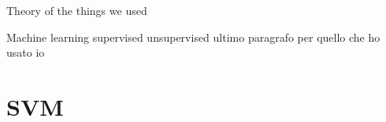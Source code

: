Theory of the things we used

Machine learning
supervised unsupervised
ultimo paragrafo per quello che ho usato io

\section{SVM} \label{svm}

